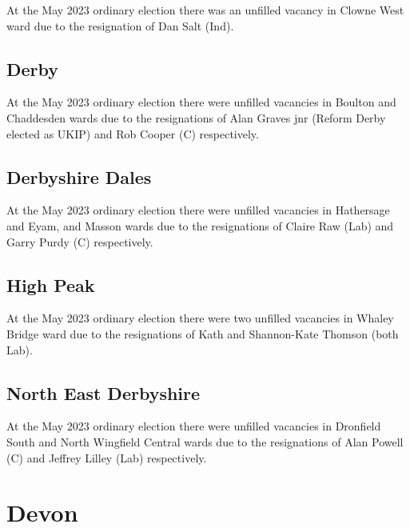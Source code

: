 \documentclass[a4paper,openany]{book}
\begin{document}
\begin{resultsiii}
At the May 2023 ordinary election there was an unfilled vacancy in Clowne West ward due to the resignation of Dan Salt (Ind).%

\subsection*{Derby}

At the May 2023 ordinary election there were unfilled vacancies in Boulton and Chaddesden wards due to the resignations of Alan Graves jnr (Reform Derby elected as UKIP) and Rob Cooper (C) respectively.%
%

\subsection*{Derbyshire Dales}

At the May 2023 ordinary election there were unfilled vacancies in Hathersage and Eyam, and Masson wards due to the resignations of Claire Raw (Lab) and Garry Purdy (C) respectively.%
%

\subsection*{High Peak}

At the May 2023 ordinary election there were two unfilled vacancies in Whaley Bridge ward due to the resignations of Kath and Shannon-Kate Thomson (both Lab).%

\subsection*{North East Derbyshire}

At the May 2023 ordinary election there were unfilled vacancies in Dronfield South and North Wingfield Central wards due to the resignations of Alan Powell (C) and Jeffrey Lilley (Lab) respectively.%

\section{Devon}


\end{resultsiii}
\end{document}
